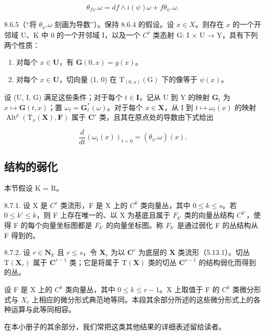 \[
\theta_ {f \psi}. \omega = d f \wedge i (\psi) \omega + f \theta_ {\psi}. \omega .\tag{8}
\]

8.6.5（“将 \(\theta_{\psi}.\omega\) 刻画为导数”）。保持 8.6.4 的假设。设 \(x\in X\)。则存在 \(x\) 的一个开邻域 U、K 中 0 的一个开邻域 I，以及一个 \(C^{r}\) 类态射 G: I × U → Y，具有下列两个性质：

\begin{enumerate}
\def\labelenumi{\alph{enumi})}
\item
  对每个 \(x \in \mathbf{U}\)，有 \(\mathbf{G}(0, x) = g(x)\)。
\item
  对每个 \(x \in \mathbf{U}\)，切向量 (1, 0) 在 \(\mathrm{T}_{(0,x)}(\mathrm{G})\) 下的像等于 \(\psi(x)\)。
\end{enumerate}

设 (U, I, G) 满足这些条件；对于每个 \(t \in \mathbf{I}\)，记从 U 到 Y 的映射 \(\mathbf{G}_t\) 为 \(x \mapsto \mathbf{G}(t, x)\)；置 \(\omega_t = \mathbf{G}_t^*(\omega)\)。对于每个 \(x \in \mathbf{X}\)，从 I 到 \(t \mapsto \omega_t(x)\) 的映射 \(\operatorname{Alt}^p(\mathrm{T}_x(\mathbf{X}), \mathbf{F})\) 属于 \(\mathbf{C}^r\) 类，且其在原点处的导数由下式给出

\[
\frac {d}{d t} (\omega_ {t} (x)) _ {t = 0} = (\theta_ {\psi}. \omega) (x).\tag{9}
\]

\subsection{结构的弱化}

本节假设 K = R。

8.7.1. 设 X 是 \(C^{s}\) 类流形，F 是 X 上的 \(C^{k}\) 类向量丛，其中 \(0 \leqslant k \leqslant s\)。若 \(0 \leqslant k' \leqslant k\)，则 F 上存在唯一的、以 X 为基底且属于 \(F_{k'}\) 类的向量丛结构 \(C^{k'}\)，使得 F 的每个向量坐标图都是 \(F_{k'}\) 的向量坐标图。称 \(F_{k'}\) 是通过弱化 F 的丛结构从 F 得到的。

8.7.2. 设 \(r \in \mathbf{N}_{\mathbb{R}}\) 且 \(r \leqslant s\)，令 \(\mathbf{X}_r\) 为以 \(\mathbf{C}^r\) 为底层的 \(\mathbf{X}\) 类流形（5.13.1）。切丛 \(\mathrm{T}(\mathbf{X}_r)\) 属于 \(\mathbf{C}^{r-1}\) 类；它是将属于 \(\mathrm{T}(\mathbf{X})\) 类的切丛 \(\mathbf{C}^{s-1}\) 的结构弱化而得到的丛。

设 F 是 X 上的 \(C^{k}\) 类向量丛，其中 \(0 \leqslant k \leqslant r - 1\)。X 上取值于 F 的 \(C^{k}\) 类微分形式与 \(X_{r}\) 上相应的微分形式典范地等同。本段其余部分所述的这些微分形式上的各种运算与此等同相容。

在本小册子的其余部分，我们常把这类其他结果的详细表述留给读者。

